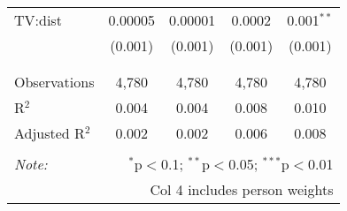 \begin{table}[!htbp]
\begin{tabular}{@{\extracolsep{-5pt}}lcccc}
 TV:dist & 0.00005 & 0.00001 & 0.0002 & 0.001$^{**}$ \\ 
  & (0.001) & (0.001) & (0.001) & (0.001) \\ 
  & & & & \\ 
\hline \\[-1.8ex] 
Observations & 4,780 & 4,780 & 4,780 & 4,780 \\ 
R$^{2}$ & 0.004 & 0.004 & 0.008 & 0.010 \\ 
Adjusted R$^{2}$ & 0.002 & 0.002 & 0.006 & 0.008 \\ 
\hline 
\hline \\[-1.8ex] 
\textit{Note:}  & \multicolumn{4}{r}{$^{*}$p$<$0.1; $^{**}$p$<$0.05; $^{***}$p$<$0.01} \\ 
 & \multicolumn{4}{r}{Col 4 includes person weights} \\ 
\end{tabular} 
\end{table} 
